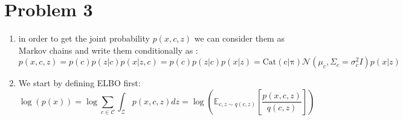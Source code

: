 \documentclass{article}
\begin{document}
\section*{Problem 3}
\begin{enumerate}
    \item in order to get the joint probability $p(x,c,z)$ we can consider them as Markov chains and write them conditionally as :
    \begin{equation*}
        p(x,c,z) = p(c) p(z|c) p(x|z,c) = p(c) p(z|c) p(x|z) = \mathrm{Cat(c | \pi)} \mathcal{N}(\mu_c, \Sigma_c=\sigma_c^2 I) p(x|z)
    \end{equation*}
    \item We start by defining ELBO first:
    \begin{equation*}
        \log(p(x)) = \log \sum_{c \in \mathcal{C}} \int_{\mathcal{Z}} p(x, c, z)  dz = \log \left( \mathbb{E}_{c, z \sim q(c, z)} \left[ \frac{p(x, c, z)}{q(c, z)} \right] \right)
    \end{equation*}


\end{enumerate}
\end{document}
